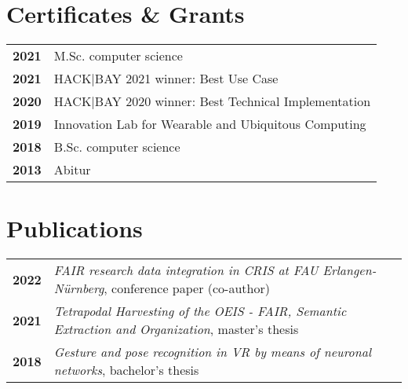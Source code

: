 \documentclass[michiscolours]{hipstercv}
\begin{document}
\begin{paracol}{2}
\begin{minipage}[t]{0.16\textwidth}
 \hfill
{} 

\end{minipage}

\vspace{4em}

\begin{minipage}[t]{0.3\textwidth}
\section*{Certificates \& Grants}
\begin{tabular}{>{\footnotesize\bfseries}r >{\footnotesize}p{}}
    2021 & M.Sc. computer science\\
    2021 &  HACK|BAY 2021 winner: Best Use Case \\
    2020 &  HACK|BAY 2020 winner: Best Technical Implementation \\
    2019 & Innovation Lab for Wearable and Ubiquitous Computing\\
    2018 & B.Sc. computer science \\
    2013 & Abitur\\

\end{tabular}
\end{minipage}\hfill
\begin{minipage}[t]{0.3\textwidth}
\section*{Publications}
\begin{tabular}{>{\footnotesize\bfseries}r >{\footnotesize}p{}}
   2022 &\emph{FAIR research data integration in CRIS at FAU Erlangen-Nürnberg}, conference paper (co-author) \\
    2021 & \emph{Tetrapodal Harvesting of the OEIS - FAIR, Semantic Extraction and Organization}, master's thesis \\
    2018 & \emph{Gesture and pose recognition in VR by means of neuronal networks}, bachelor's thesis 
\end{tabular}

\end{minipage}
\end{paracol}
\end{document}
